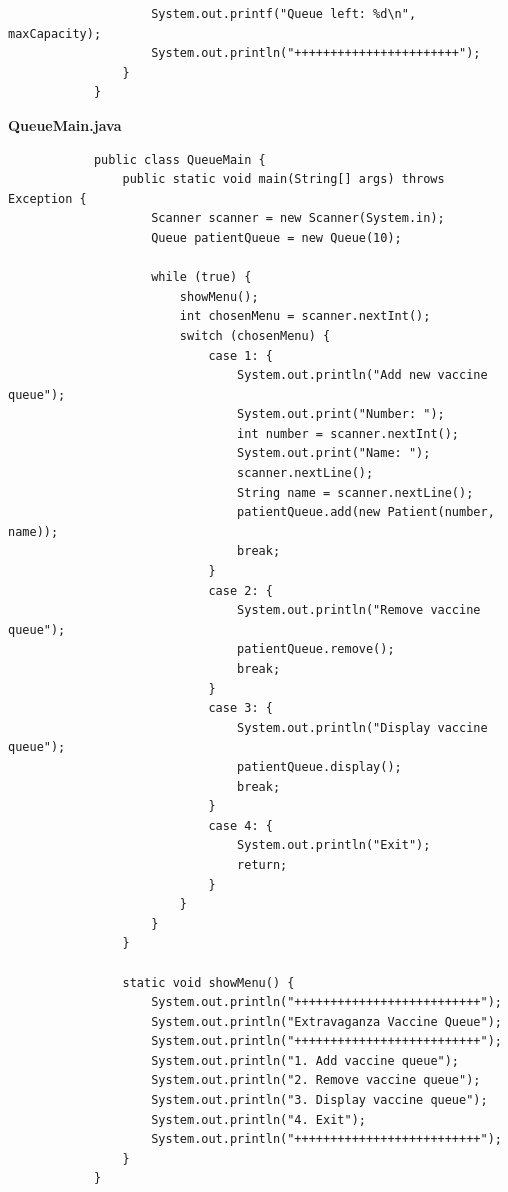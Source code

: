 \documentclass[12pt,titlepage]{article}
\begin{document}
\begin{enumerate}
{\begin{verbatim}
                    System.out.printf("Queue left: %d\n", maxCapacity);
                    System.out.println("+++++++++++++++++++++++");
                }
            }
        \end{verbatim}

        \large{\textbf{QueueMain.java}}
        \begin{verbatim}
            public class QueueMain {
                public static void main(String[] args) throws Exception {
                    Scanner scanner = new Scanner(System.in);
                    Queue patientQueue = new Queue(10);

                    while (true) {
                        showMenu();
                        int chosenMenu = scanner.nextInt();
                        switch (chosenMenu) {
                            case 1: {
                                System.out.println("Add new vaccine queue");
                                System.out.print("Number: ");
                                int number = scanner.nextInt();
                                System.out.print("Name: ");
                                scanner.nextLine();
                                String name = scanner.nextLine();
                                patientQueue.add(new Patient(number, name));
                                break;
                            }
                            case 2: {
                                System.out.println("Remove vaccine queue");
                                patientQueue.remove();
                                break;
                            }
                            case 3: {
                                System.out.println("Display vaccine queue");
                                patientQueue.display();
                                break;
                            }
                            case 4: {
                                System.out.println("Exit");
                                return;
                            }
                        }
                    }
                }

                static void showMenu() {
                    System.out.println("++++++++++++++++++++++++++");
                    System.out.println("Extravaganza Vaccine Queue");
                    System.out.println("++++++++++++++++++++++++++");
                    System.out.println("1. Add vaccine queue");
                    System.out.println("2. Remove vaccine queue");
                    System.out.println("3. Display vaccine queue");
                    System.out.println("4. Exit");
                    System.out.println("++++++++++++++++++++++++++");
                }
            }
        \end{verbatim}

}
\end{enumerate}
\end{document}
